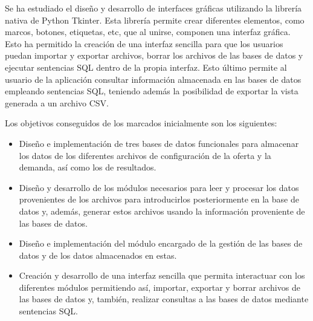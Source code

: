Se ha estudiado el diseño y desarrollo de interfaces gráficas utilizando la librería nativa de Python Tkinter. Esta librería permite crear diferentes elementos, como marcos, botones, etiquetas, etc, que al unirse, componen una interfaz gráfica. Esto ha permitido la creación de una interfaz sencilla para que los usuarios puedan importar y exportar archivos, borrar los archivos de las bases de datos y ejecutar sentencias \acrshort{SQL} dentro de la propia interfaz. Esto último permite al usuario de la aplicación consultar información almacenada en las bases de datos empleando sentencias \acrshort{SQL}, teniendo además la posibilidad de exportar la vista generada a un archivo \acrshort{CSV}.

Los objetivos conseguidos de los marcados inicialmente son los siguientes:
\begin{itemize}

\item Diseño e implementación de tres bases de datos funcionales para almacenar los datos de los diferentes archivos de configuración de la oferta y la demanda, así como los de resultados.

\item Diseño y desarrollo de los módulos necesarios para leer y procesar los datos provenientes de los archivos para introducirlos posteriormente en la base de datos y, además, generar estos archivos usando la información proveniente de las bases de datos.

\item Diseño e implementación del módulo encargado de la gestión de las bases de datos y de los datos almacenados en estas.

\item Creación y desarrollo de una interfaz sencilla que permita interactuar con los diferentes módulos permitiendo así, importar, exportar y borrar archivos de las bases de datos y, también, realizar consultas a las bases de datos mediante sentencias \acrshort{SQL}.

\end{itemize}

